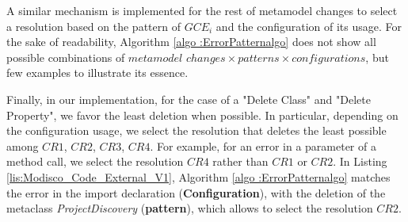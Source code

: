 


A similar mechanism is implemented for the rest of metamodel changes to select a resolution based on the pattern of $GCE_i$ and the configuration of its usage. %
For the sake of readability, Algorithm \ref{algo :ErrorPatternalgo} does not show all possible combinations of $metamodel$ $changes \times patterns \times configurations$, but few examples to illustrate its essence. 

%
Finally, in our implementation, for the case of a "Delete Class" and "Delete Property", we favor the least deletion when possible. In particular, depending on the configuration usage, we select the resolution that deletes the least possible among $CR1$, $CR2$, $CR3$, $CR4$. For example, for an error in a parameter of a method call, we select the resolution $CR4$ rather than $CR1$ or $CR2$. 
In Listing \ref{lis:Modisco_Code_External_V1}, Algorithm \ref{algo :ErrorPatternalgo} matches the error in the import declaration (\textbf{Configuration}), with the deletion of the metaclass \textit{ProjectDiscovery} (\textbf{pattern}), which allows to select the resolution $CR2$.





